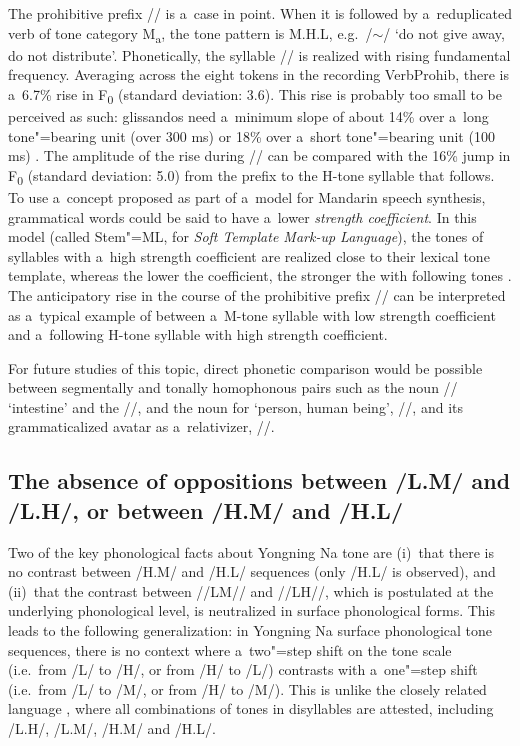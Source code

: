 The {prohibitive} prefix // is a~case in point. When it is followed by a~reduplicated verb
of tone category M\textsubscript{a}, the tone pattern is M.H.L,
e.g.~/${\sim}$/ ‘do not give away, do not distribute’. Phonetically, the
syllable // is realized with rising fundamental frequency. Averaging across the eight tokens in the recording VerbProhib,
there is a~6.7\% rise in F\textsubscript{0} (standard deviation: 3.6). This
rise is probably too small to be perceived as such: glissandos need a~minimum slope of about 14\%
over a~long tone"=bearing unit (over 300 ms) or 18\% over a~short tone"=bearing unit (100 ms)
\citep{rossi1971b,gsell1979b}. The amplitude of the rise during // can be compared with
the 16\% jump in F\textsubscript{0} (standard deviation: 5.0) from the
prefix to the H-tone syllable that follows. To use a~concept
proposed as part of a~model for {Mandarin} speech synthesis, grammatical words could be said to have a~lower \textit{strength
coefficient}. In this model (called Stem"=ML, for \textit{Soft Template Mark-up Language}), the tones of syllables with a~high strength coefficient are
realized close to their lexical tone template, whereas the lower the coefficient, the stronger the
 with following tones \citep{kochanskietal2003b}. The anticipatory rise in the course of the {prohibitive} prefix // can be interpreted as a~typical example
of  between a~M-tone syllable with low strength coefficient and a~following H-tone
syllable with high strength coefficient.

For future studies of this topic, direct phonetic comparison would be possible between segmentally and tonally homophonous pairs such as the noun // ‘intestine’ and the  //, and the noun for
‘person, human being’, \mbox{//}, and its grammaticalized avatar as a~{relativizer}, \mbox{//}.


\subsection{The absence of oppositions between /L.M/ and /L.H/, or between /H.M/ and /H.L/}
\label{sec:theabsenceofoppositionsbetweenlmandlhorbetweenhmandhl}

Two of the key phonological facts about Yongning Na tone are (i)~that there is no contrast between /H.M/ and /H.L/
sequences (only /H.L/ is observed), and (ii)~that the contrast between \mbox{//LM//} and \mbox{//LH//}, which is postulated at
the underlying phonological level, is neutralized in surface phonological forms. This leads to
the following generalization: in Yongning Na surface phonological tone sequences, there is no context where a~two"=step shift on the
tone scale (i.e.\ from /L/ to /H/, or from /H/ to /L/) contrasts with a~one"=step shift (i.e.\ from /L/ to /M/, or
from /H/ to /M/). This is unlike the closely related language , where all combinations of tones in disyllables
are attested, including /L.H/, /L.M/, /H.M/ and /H.L/.

